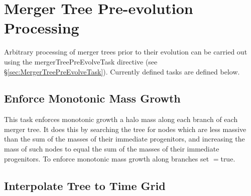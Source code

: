 \section{Merger Tree Pre-evolution Processing}

Arbitrary processing of merger trees prior to their evolution can be carried out using the {\normalfont \ttfamily mergerTreePreEvolveTask} directive (see \S\ref{sec:MergerTreePreEvolveTask}). Currently defined tasks are defined below.

\subsection{Enforce Monotonic Mass Growth}

This task enforces monotonic growth a halo mass along each branch of each merger tree. It does this by searching the tree for nodes which are less massive than the sum of the masses of their immediate progenitors, and increasing the mass of such nodes to equal the sum of the masses of their immediate progenitors. To enforce monotonic mass growth along branches set {\normalfont \ttfamily [mergerTreeEnforceMonotonicGrowth]}$=${\normalfont \ttfamily true}.

\subsection{Interpolate Tree to Time Grid}\label{sec:MergerTreeTimeRegrid}


